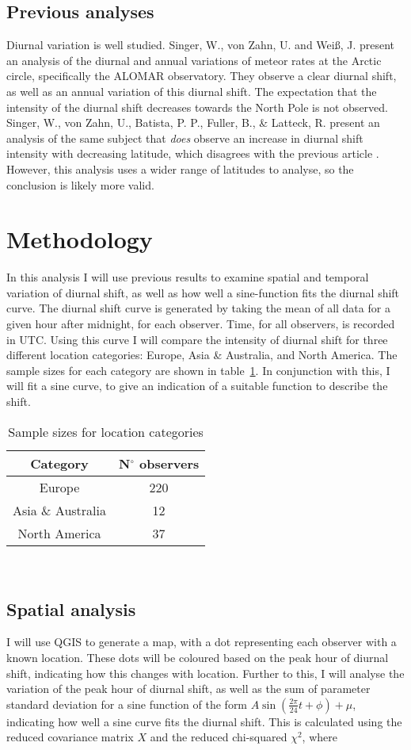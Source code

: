 \subsection{Previous analyses}
\label{sec:dishift:litrev}
Diurnal variation is well studied. Singer, W., von Zahn, U. and Wei{\ss}, J. present an analysis \cite{alomar} of the diurnal and annual variations of meteor rates at the Arctic circle, specifically the ALOMAR observatory. They observe a clear diurnal shift, as well as an annual variation of this diurnal shift. The expectation that the intensity of the diurnal shift decreases towards the North Pole is not observed. \\
Singer, W., von Zahn, U., Batista, P. P., Fuller, B., \& Latteck, R. present an analysis \cite{latitudes} of the same subject that {\it does} observe an increase in diurnal shift intensity with decreasing latitude, which disagrees with the previous article \cite{alomar}. However, this analysis uses a wider range of latitudes to analyse, so the conclusion is likely more valid.
\section{Methodology}
In this analysis I will use previous results to examine spatial and temporal variation of diurnal shift, as well as how well a sine-function fits the diurnal shift curve.
The diurnal shift curve is generated by taking the mean of all data for a given hour after midnight, for each observer. Time, for all observers, is recorded in UTC. Using this curve I will compare the intensity of diurnal shift for three different location categories: Europe, Asia \& Australia, and North America. The sample sizes for each category are shown in table~\ref{tab:dishift:spatial}. In conjunction with this, I will fit a sine curve, to give an indication of a suitable function to describe the shift.
\begin{table}
	\begin{tabular}{cc}
		\hline
		Category & N$^{\circ}$ observers \\ \hline
		Europe & 220 \\
		Asia \& Australia & 12 \\
		North America & 37 \\
		\hline
	\end{tabular}
	\caption{Sample sizes for location categories
		\label{tab:dishift:spatial}}
\end{table}\\
\subsection{Spatial analysis}
I will use QGIS \cite{qgis} to generate a map, with a dot representing each observer with a known location. These dots will be coloured based on the peak hour of diurnal shift, indicating how this changes with location. Further to this, I will analyse the variation of the peak hour of diurnal shift, as well as the sum of parameter standard deviation for a sine function of the form $A \sin \left( \frac{2\pi}{24} t + \phi \right) + \mu$, indicating how well a sine curve fits the diurnal shift. This is calculated 
using the reduced covariance matrix $X$ and the reduced 
chi-squared $\chi^2$, where

